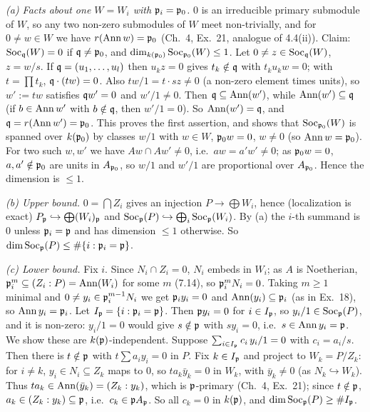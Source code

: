 \documentclass[11pt]{article}
\begin{document}
\emph{(a) Facts about one $W=W_i$ with $\mathfrak p_i=\mathfrak p_0$.} $0$ is an irreducible primary submodule of $W$, so any two non-zero submodules of $W$ meet non-trivially, and for $0\ne w\in W$ we have $r(\operatorname{Ann} w)=\mathfrak p_0$ (Ch.~4, Ex.~21, analogue of 4.4(ii)). Claim: $\operatorname{Soc}_\mathfrak q(W)=0$ if $\mathfrak q\ne\mathfrak p_0$, and $\dim_{k(\mathfrak p_0)}\operatorname{Soc}_{\mathfrak p_0}(W)\le1$. Let $0\ne z\in\operatorname{Soc}_\mathfrak q(W)$, $z=w/s$. If $\mathfrak q=(u_1,\dots,u_l)$ then $u_kz=0$ gives $t_k\notin\mathfrak q$ with $t_ku_kw=0$; with $t=\prod t_k$, $\mathfrak q\cdot(tw)=0$. Also $tw/1=t\cdot s z\ne0$ (a non-zero element times units), so $w':=tw$ satisfies $\mathfrak q w'=0$ and $w'/1\ne0$. Then $\mathfrak q\subseteq\operatorname{Ann}(w')$, while $\operatorname{Ann}(w')\subseteq\mathfrak q$ (if $b\in\operatorname{Ann} w'$ with $b\notin\mathfrak q$, then $w'/1=0$). So $\operatorname{Ann}(w')=\mathfrak q$, and $\mathfrak q=r(\operatorname{Ann} w')=\mathfrak p_0$. This proves the first assertion, and shows that $\operatorname{Soc}_{\mathfrak p_0}(W)$ is spanned over $k(\mathfrak p_0)$ by classes $w/1$ with $w\in W$, $\mathfrak p_0w=0$, $w\ne0$ (so $\operatorname{Ann} w=\mathfrak p_0$). For two such $w,w'$ we have $Aw\cap Aw'\ne0$, i.e.\ $aw=a'w'\ne0$; as $\mathfrak p_0w=0$, $a,a'\notin\mathfrak p_0$ are units in $A_{\mathfrak p_0}$, so $w/1$ and $w'/1$ are proportional over $A_{\mathfrak p_0}$. Hence the dimension is $\le1$.

\emph{(b) Upper bound.} $0=\bigcap Z_i$ gives an injection $P\to\bigoplus W_i$, hence (localization is exact) $P_\mathfrak p\hookrightarrow\bigoplus(W_i)_\mathfrak p$ and $\operatorname{Soc}_\mathfrak p(P)\hookrightarrow\bigoplus_i\operatorname{Soc}_\mathfrak p(W_i)$. By (a) the $i$-th summand is $0$ unless $\mathfrak p_i=\mathfrak p$ and has dimension $\le1$ otherwise. So $\dim\operatorname{Soc}_\mathfrak p(P)\le\#\{i:\mathfrak p_i=\mathfrak p\}$.

\emph{(c) Lower bound.} Fix $i$. Since $N_i\cap Z_i=0$, $N_i$ embeds in $W_i$; as $A$ is Noetherian, $\mathfrak p_i^m\subseteq(Z_i:P)=\operatorname{Ann}(W_i)$ for some $m$ (7.14), so $\mathfrak p_i^mN_i=0$. Taking $m\ge1$ minimal and $0\ne y_i\in\mathfrak p_i^{m-1}N_i$ we get $\mathfrak p_iy_i=0$ and $\operatorname{Ann}(y_i)\subseteq\mathfrak p_i$ (as in Ex.~18), so $\operatorname{Ann} y_i=\mathfrak p_i$. Let $I_\mathfrak p=\{i:\mathfrak p_i=\mathfrak p\}$. Then $\mathfrak p y_i=0$ for $i\in I_\mathfrak p$, so $y_i/1\in\operatorname{Soc}_\mathfrak p(P)$, and it is non-zero: $y_i/1=0$ would give $s\notin\mathfrak p$ with $sy_i=0$, i.e.\ $s\in\operatorname{Ann} y_i=\mathfrak p$. We show these are $k(\mathfrak p)$-independent. Suppose $\sum_{i\in I_\mathfrak p}c_i\,y_i/1=0$ with $c_i=a_i/s$. Then there is $t\notin\mathfrak p$ with $t\sum a_iy_i=0$ in $P$. Fix $k\in I_\mathfrak p$ and project to $W_k=P/Z_k$: for $i\ne k$, $y_i\in N_i\subseteq Z_k$ maps to $0$, so $ta_k\bar y_k=0$ in $W_k$, with $\bar y_k\ne0$ (as $N_k\hookrightarrow W_k$). Thus $ta_k\in\operatorname{Ann}(\bar y_k)=(Z_k:y_k)$, which is $\mathfrak p$-primary (Ch.~4, Ex.~21); since $t\notin\mathfrak p$, $a_k\in(Z_k:y_k)\subseteq\mathfrak p$, i.e.\ $c_k\in\mathfrak p A_\mathfrak p$. So all $c_k=0$ in $k(\mathfrak p)$, and $\dim\operatorname{Soc}_\mathfrak p(P)\ge\#I_\mathfrak p$.
\end{document}

